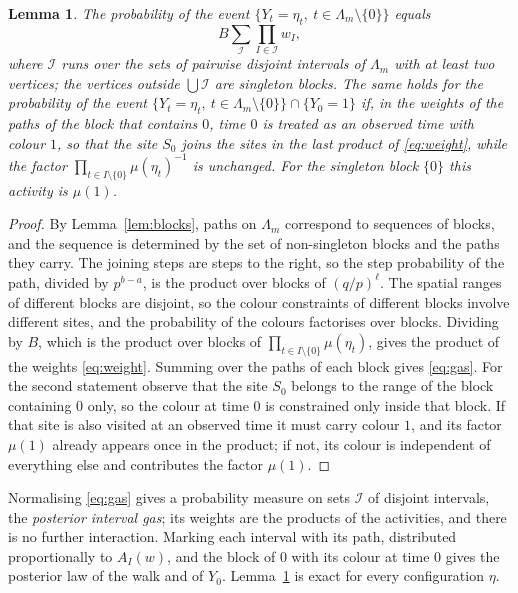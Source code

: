 \documentclass[11pt]{amsart}
\newtheorem{lemma}[theorem]{Lemma}
\theoremstyle{remark}
\begin{document}
\begin{lemma}\label{lem:gas}
The probability of the event $\{Y_t=\eta_t,\ t\in\Lambda_m\setminus\{0\}\}$ equals
\begin{equation}\label{eq:gas}
B\sum_{\mathcal I}\prod_{I\in\mathcal I}w_I ,
\end{equation}
where $\mathcal I$ runs over the sets of pairwise disjoint intervals of $\Lambda_m$ with at least two vertices; the
vertices outside $\bigcup\mathcal I$ are singleton blocks. The same holds for the probability of the event
$\{Y_t=\eta_t,\ t\in\Lambda_m\setminus\{0\}\}\cap\{Y_0=1\}$ if, in the weights of the paths of the block that contains
$0$, time $0$ is treated as an observed time with colour $1$, so that the site $S_0$ joins the sites in the last product
of \eqref{eq:weight}, while the factor $\prod_{t\in I\setminus\{0\}}\mu(\eta_t)^{-1}$ is unchanged. For the singleton
block $\{0\}$ this activity is $\mu(1)$.
\end{lemma}

\begin{proof}
By Lemma~\ref{lem:blocks}, paths on $\Lambda_m$ correspond to sequences of blocks, and the sequence is determined by
the set of non-singleton blocks and the paths they carry. The joining steps are steps to the right, so the step
probability of the path, divided by $p^{b-a}$, is the product over blocks of $(q/p)^{\ell}$. The spatial ranges of
different blocks are disjoint, so the colour constraints of different blocks involve different sites, and the
probability of the colours factorises over blocks. Dividing by $B$, which is the product over blocks of
$\prod_{t\in I\setminus\{0\}}\mu(\eta_t)$, gives the product of the weights \eqref{eq:weight}. Summing over the paths of
each block gives \eqref{eq:gas}. For the second statement observe that the site $S_0$ belongs to the range of the block
containing $0$ only, so the colour at time $0$ is constrained only inside that block. If that site is also visited at
an observed time it must carry colour $1$, and its factor $\mu(1)$ already appears once in the product; if not, its
colour is independent of everything else and contributes the factor $\mu(1)$.
\end{proof}

Normalising \eqref{eq:gas} gives a probability measure on sets $\mathcal I$ of disjoint intervals, the \emph{posterior
interval gas}; its weights are the products of the activities, and there is no further interaction. Marking each
interval with its path, distributed proportionally to $A_I(w)$, and the block of $0$ with its colour at time $0$ gives
the posterior law of the walk and of $Y_0$. Lemma~\ref{lem:gas} is exact for every configuration $\eta$.
\end{document}
